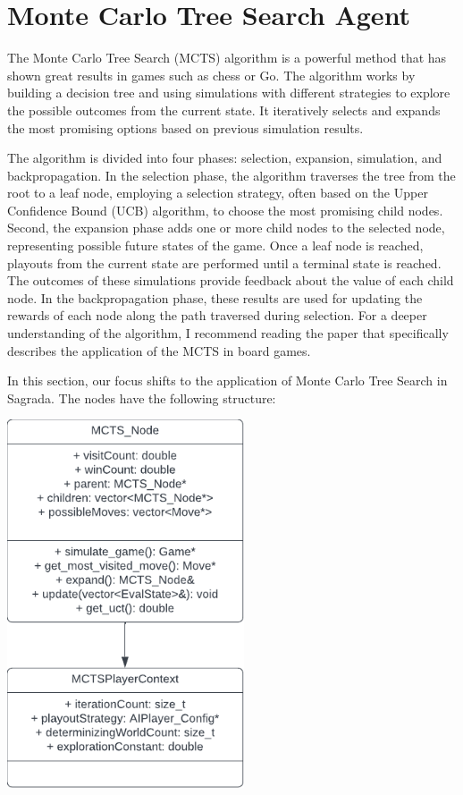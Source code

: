 \chapter{Monte Carlo Tree Search Agent} \label{chap:MCTS}

The Monte Carlo Tree Search (MCTS) algorithm is a powerful method that has shown great results in games such as chess or Go. The algorithm
works by building a decision tree and using simulations with different strategies to explore the possible outcomes from the current state. 
It iteratively selects and expands the most promising options based on previous simulation results.

The algorithm is divided into four phases: selection, expansion, simulation, and backpropagation. In the selection phase, the algorithm 
traverses the tree from the root to a leaf node, employing a selection strategy, often based on the Upper Confidence Bound (UCB) algorithm, to choose the 
most promising child nodes. Second, the expansion phase adds one or more child nodes to the selected node, representing possible future states 
of the game. Once a leaf node is reached, playouts from the current state are performed until a terminal state is reached. The outcomes of these simulations 
provide feedback about the value of each child node. In the backpropagation phase, these results are used for updating the rewards of each node along 
the path traversed during selection. For a deeper understanding of the algorithm, I recommend reading the paper \cite{winands2017monte} that specifically describes
the application of the MCTS in board games. 

In this section, our focus shifts to the application of Monte Carlo Tree Search in Sagrada. The nodes have the following structure:

\centerline{\mbox{\includegraphics[width=70mm]{img/MCTS_NodeUML.pdf}}}



